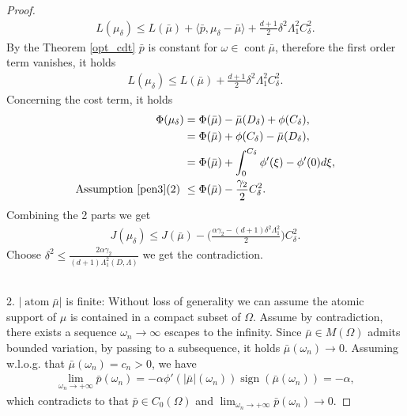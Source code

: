 \documentclass[12pt,fleqn]{amsart}
\theoremstyle{definition}
\DeclareMathOperator*{\atom}{atom}
\DeclareMathOperator*{\cont}{cont}
\DeclareMathOperator*{\sign}{sign}
\begin{document}
\begin{proof}
\begin{align*}
	L(\mu_\delta) \le L(\bar{\mu}) + \langle \bar{p}, \mu_\delta - \bar{\mu} \rangle + \frac{d + 1}{2}\delta^2 \Lambda_1^2 C_\delta^2. 
\end{align*}
By the Theorem \ref{opt_cdt} $\bar{p}$ is constant for $\omega \in \cont \bar{\mu}$, therefore the first order term vanishes, it holds
\begin{align*}
	L(\mu_\delta) \le L(\bar{\mu})  + \frac{d + 1}{2}\delta^2 \Lambda_1^2 C_\delta^2. 
\end{align*}
Concerning the cost term, it holds
\begin{align*}
	\Phi(\mu_\delta) &= \Phi(\bar{\mu}) - \bar{\mu}(D_\delta) + \phi(C_\delta),\\
	&=\Phi(\bar{\mu}) + \phi(C_\delta) - \bar{\mu}(D_\delta) , \\
	&= \Phi(\bar{\mu}) + \int_0^{C_\delta} \phi'(\xi) - \phi'(0) d\xi,\\
	\text{Assumption \ref{pen3}(2) }
	& \le \Phi(\bar{\mu}) - \frac{ \gamma_2 }{2} C_\delta^2. 
\end{align*}
Combining the 2 parts we get
\begin{align*}
	J(\mu_\delta) \le J(\bar{\mu}) - \bigg(\frac{ \alpha \gamma_2 - (d + 1) \delta^2 \Lambda_1^2}{2} \bigg) C_\delta^2.
\end{align*}
Choose $\delta^2 \le \frac{2 \alpha \gamma_2}{(d + 1)\Lambda_1^2(D, \Lambda)}$ we get the contradiction.

\quad\\
2. $|\atom \bar{\mu}|$ is finite: 
Without loss of generality we can assume the atomic support of $\mu$ is contained in a compact subset of $\Omega$. 
Assume by contradiction, there exists a sequence $\omega_n \rightarrow \infty $ escapes to the infinity.
Since $\bar{\mu} \in M(\Omega)$ admits bounded variation, by passing to a subsequence, it holds $\bar{\mu}(\omega_n) \rightarrow 0$. 
Assuming w.l.o.g. that $\bar{\mu}(\omega_n) = c_n > 0$, we have
\begin{equation*}
	\begin{aligned}
		\lim_{\omega_n \rightarrow + \infty } \bar{p}(\omega_n)
	= -\alpha \phi'(|\bar{\mu}|(\omega_n)) \sign (\bar{\mu}(\omega_n))
	= - \alpha,
	\end{aligned}
\end{equation*}
which contradicts to that $\bar{p} \in C_0(\Omega)$ and $\lim_{\omega_n \rightarrow + \infty } \bar{p}(\omega_n) \rightarrow 0$.


\end{proof}
\end{document}
